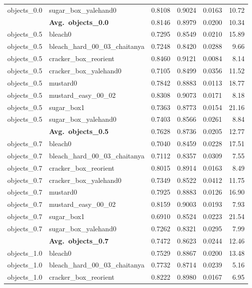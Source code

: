 \begin{longtable}{llrrrr}
  objects_0.0 & sugar\_box\_yalehand0 & 0.8108 & 0.9024 & 0.0163 & 10.72 \\
  \cmidrule{2-6}
  & \textbf{Avg.~objects_0.0} & 0.8146 & 0.8979 & 0.0200 & 10.34 \\
  \midrule
  objects_0.5 & bleach0 & 0.7295 & 0.8549 & 0.0210 & 15.89 \\
  objects_0.5 & bleach\_hard\_00\_03\_chaitanya & 0.7248 & 0.8420 & 0.0288 & 9.66 \\
  objects_0.5 & cracker\_box\_reorient & 0.8460 & 0.9121 & 0.0084 & 8.14 \\
  objects_0.5 & cracker\_box\_yalehand0 & 0.7105 & 0.8499 & 0.0356 & 11.52 \\
  objects_0.5 & mustard0 & 0.7842 & 0.8883 & 0.0113 & 18.77 \\
  objects_0.5 & mustard\_easy\_00\_02 & 0.8308 & 0.9073 & 0.0171 & 8.18 \\
  objects_0.5 & sugar\_box1 & 0.7363 & 0.8773 & 0.0154 & 21.16 \\
  objects_0.5 & sugar\_box\_yalehand0 & 0.7403 & 0.8566 & 0.0261 & 8.84 \\
  \cmidrule{2-6}
  & \textbf{Avg.~objects_0.5} & 0.7628 & 0.8736 & 0.0205 & 12.77 \\
  \midrule
  objects_0.7 & bleach0 & 0.7040 & 0.8459 & 0.0228 & 17.51 \\
  objects_0.7 & bleach\_hard\_00\_03\_chaitanya & 0.7112 & 0.8357 & 0.0309 & 7.55 \\
  objects_0.7 & cracker\_box\_reorient & 0.8015 & 0.8914 & 0.0163 & 8.49 \\
  objects_0.7 & cracker\_box\_yalehand0 & 0.7349 & 0.8522 & 0.0412 & 11.75 \\
  objects_0.7 & mustard0 & 0.7925 & 0.8883 & 0.0126 & 16.90 \\
  objects_0.7 & mustard\_easy\_00\_02 & 0.8159 & 0.9003 & 0.0193 & 7.93 \\
  objects_0.7 & sugar\_box1 & 0.6910 & 0.8524 & 0.0223 & 21.54 \\
  objects_0.7 & sugar\_box\_yalehand0 & 0.7262 & 0.8321 & 0.0295 & 7.99 \\
  \cmidrule{2-6}
  & \textbf{Avg.~objects_0.7} & 0.7472 & 0.8623 & 0.0244 & 12.46 \\
  \midrule
  objects_1.0 & bleach0 & 0.7529 & 0.8867 & 0.0200 & 13.48 \\
  objects_1.0 & bleach\_hard\_00\_03\_chaitanya & 0.7732 & 0.8714 & 0.0239 & 5.16 \\
  objects_1.0 & cracker\_box\_reorient & 0.8222 & 0.8980 & 0.0167 & 6.95 \\

\end{longtable}
